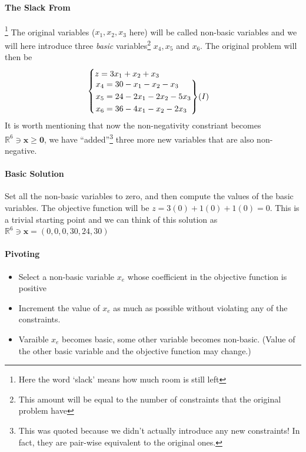 \documentclass[10pt]{article}
\newcommand{\real}{\mathbb{R}}
\newcommand{\vzero}{\mathbf{0}}
\newcommand{\bx}{\mathbf{x}}
\newenvironment{rcases}
  {\left.\begin{aligned}}
  {\end{aligned}\right\rbrace}
\begin{document}
\paragraph{The Slack From}\footnote{Here the word `slack' means how much room is still left} The original variables ($x_1, x_2, x_3$ here) will be called non-basic variables and we will here introduce three \textit{basic} variables\footnote{This amount will be equal to the number of constraints that the original problem have} $x_4, x_5$ and $x_6$. The original problem will then be
\begin{equation*}
    \begin{cases}
        z = 3x_1 + x_2 +x_3 \\
        \begin{rcases}
            x_4 &= 30 - x_1 - x_2 - x_3 \\
            x_5 &= 24 - 2x_1 - 2x_2 - 5x_3 \\
            x_6 &= 36 - 4x_1 - x_2 - 2x_3
        \end{rcases}
        (I)
    \end{cases}
\end{equation*}
It is worth mentioning that now the non-negativity constriant becomes $\real^6 \ni \bx \geq \vzero$, we have ``added''\footnote{This was quoted because we didn't actually introduce any new constraints! In fact, they are pair-wise equivalent to the original ones.} three more new variables that are also non-negative.

\paragraph{Basic Solution} Set all the non-basic variables to zero, and then compute the values of the basic variables. The objective function will be $z = 3(0) + 1(0) + 1(0) = 0$. This is a trivial starting point and we can think of this solution as $\real^6 \ni \bx = (0,0,0,30, 24, 30)$

\paragraph{Pivoting} 
\begin{itemize}
    \item Select a non-basic variable $x_e$ whose coefficient in the objective function is positive
    \item Increment the value of $x_e$ as much as possible without violating any of the constraints. 
    \item Varaible $x_e$ becomes basic, some other variable becomes non-basic. (Value of the other basic variable and the objective function may change.) 
\end{itemize}
\end{document}

